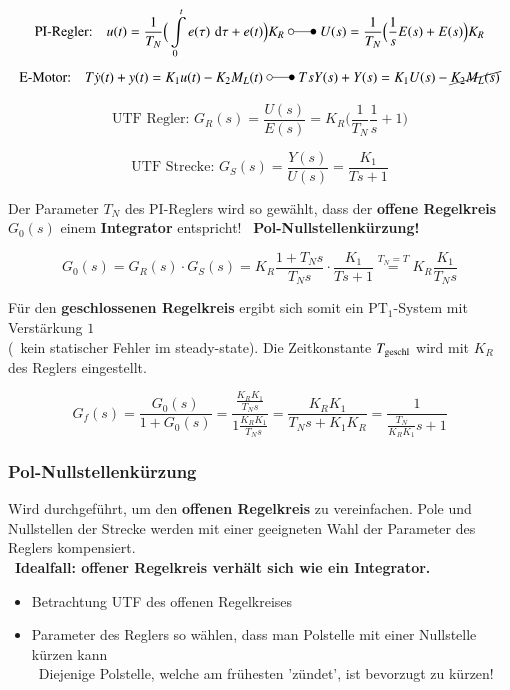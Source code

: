 \vspace{-0.4cm}
$$ \text{PI-Regler:} \quad u(t) = \frac{1}{T_N} \Big( \int\limits_0^t e(\tau) \, \diff \tau + e(t) \Big) K_R
    \; \laplace \; U(s) = \frac{1}{T_N} \Big( \frac{1}{s} E(s) + E(s) \Big) K_R $$
$$ \text{E-Motor:} \quad T \dot{y}(t) + y(t) = K_1 u(t) - K_2 M_L(t) 
    \; \laplace \; T s Y(s) + Y(s) = K_1 U(s) - \cancel{ K_2 M_L(s)} $$

\vspace{-0.3cm}
\begin{minipage}[t]{0.5\columnwidth}
    $$ \text{UTF Regler: } G_R(s) = \frac{U(s)}{E(s)} = K_R \Big( \frac{1}{T_N} \frac{1}{s} + 1 \Big) $$
\end{minipage}
\hfill
\begin{minipage}[t]{0.46\columnwidth}
    $$ \text{UTF Strecke: } G_S(s) = \frac{Y(s)}{U(s)} = \frac{K_1}{T s + 1} $$
\end{minipage}

Der  Parameter $T_N$ des PI-Reglers wird so gewählt, dass der \textbf{offene Regelkreis} $G_0(s)$ einem \textbf{Integrator} entspricht!
\textrightarrow\ \textbf{Pol-Nullstellenkürzung!}

$$ G_0(s) = G_R(s) \cdot G_S(s) = K_R \frac{1 + T_N s}{T_N s} \cdot \frac{K_1}{T s + 1} \overset{T_N = T}{=} K_R \frac{K_1}{T_N s} $$

Für den \textbf{geschlossenen Regelkreis} ergibt sich somit ein $\text{PT}_1$-System mit Verstärkung $1$\\
(\textrightarrow\ kein statischer Fehler im steady-state). Die Zeitkonstante $T_{\rm geschl}$ wird mit $K_R$ des Reglers eingestellt.

$$ G_f(s) = \frac{G_0(s)}{1 + G_0(s)} =  \frac{\frac{K_R  K_1}{T_N s} }{1 \frac{K_R  K_1}{T_N s}} = \frac{K_R K_1}{T_N s + K_1 K_R} = \frac{1}{\frac{T_N}{K_R  K_1}s + 1} $$


\subsubsection{Pol-Nullstellenkürzung}

Wird durchgeführt, um den \textbf{offenen Regelkreis} zu vereinfachen. Pole und Nullstellen der Strecke werden mit einer geeigneten
Wahl der Parameter des Reglers kompensiert. \\
\textrightarrow\ \textbf{Idealfall: offener Regelkreis verhält sich wie ein Integrator.}

\begin{itemize}
    \item Betrachtung UTF des offenen Regelkreises
    \item Parameter des Reglers so wählen, dass man Polstelle mit einer Nullstelle kürzen kann \\
        \textrightarrow\ Diejenige Polstelle, welche am frühesten 'zündet', ist bevorzugt zu kürzen!
\end{itemize}


